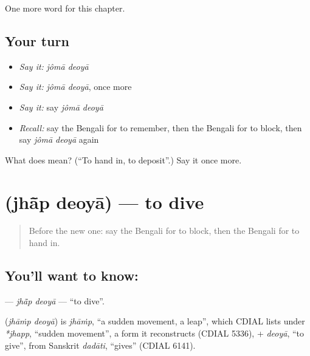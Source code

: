 \begin{grammarlens}[title={What you've built}]
One more word for this chapter.
\end{grammarlens}

\subsection*{Your turn}
\begin{itemize}
\raggedright
  \item \emph{Say it:} \emph{jômā deoyā}
  \item \emph{Say it:} \emph{jômā deoyā}, once more
  \item \emph{Say it:} say \emph{jômā deoyā}
  \item \emph{Recall:} say the Bengali for to remember, then the Bengali for to block, then say \emph{jômā deoyā} again
\end{itemize}

\begin{tcolorbox}[breakable,colback=teal!4,colframe=teal!35!black,title={Before you move on}]
What does   mean? (\textquotedblleft{}To hand in, to deposit\textquotedblright{}.) Say it once more.
\end{tcolorbox}
\section[\texorpdfstring{\bn{ঝাঁপ} \bn{দেওয়া} (jhā̃p deoyā)}{ঝাঁপ দেওয়া (jhā̃p deoyā)}]{  (jhā̃p deoyā) — to dive}

\label{lesson:BN-C240-jhap-deoya}



\begin{quote}
Before the new one: say the Bengali for to block, then the Bengali for to hand in.
\end{quote}

\subsection*{You'll want to know:  }
\textbf{ } — \emph{jhā̃p deoyā} — \textquotedblleft{}to dive\textquotedblright{}.

\begin{cousinweb}
\textbf{ } (\emph{jhāṁp deoyā}) is \emph{jhāṁp}, \textquotedblleft{}a sudden movement, a leap\textquotedblright{}, which CDIAL lists under \emph{*jhapp}, \textquotedblleft{}sudden movement\textquotedblright{}, a form it reconstructs (CDIAL 5336), + \emph{deoyā}, \textquotedblleft{}to give\textquotedblright{}, from Sanskrit \emph{dadāti}, \textquotedblleft{}gives\textquotedblright{} (CDIAL 6141).
\end{cousinweb}

